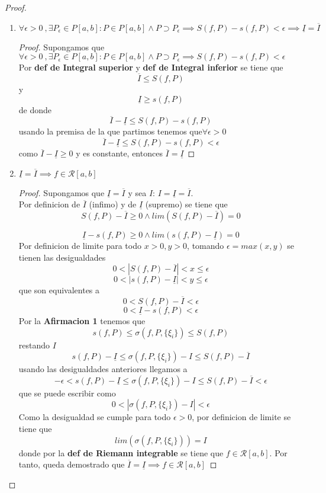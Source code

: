 \documentclass{article}
\begin{document}
\begin{proof}
\begin{enumerate}
\begin{proof}
\end{proof}
\item \(\forall \epsilon>0\ ,  \exists P_\epsilon \in P[a, b]: P \in P[a, b] \wedge P \supset P_\epsilon \implies S(f, P) - s(f, P) < \epsilon \implies \underline{I} = \overline{I}\)
\begin{proof}
Supongamos que \(\forall \epsilon>0\ ,  \exists P_\epsilon \in P[a, b]: P \in P[a, b] \wedge P \supset P_\epsilon \implies S(f, P) - s(f, P) < \epsilon\)\\

Por \textbf{def de Integral superior} y \textbf{def de Integral inferior} se tiene que
\[
 \overline{I} \leq S(f, P) 
\]
y
\[
 \underline{I} \geq s(f, P)
\]
de donde 
\[
 \overline{I}  -  \underline{I} \leq S(f,P) - s(f,P) 
\]
usando la premisa de la que partimos tenemos que\( \forall \epsilon > 0\)
\[
 \overline{I}  -  \underline{I} \leq S(f,P) - s(f,P) < \epsilon
\]
como \(\overline{I}  -  \underline{I} \geq 0\) y es constante, entonces \(\overline{I} = \underline{I}\)


\end{proof}

\item \(\underline{I} = \overline{I} \implies f \in \mathcal{R}[a, b]\)\\
\begin{proof}

Supongamos que  \(\underline{I} = \overline{I}\) y sea \(I\): \(I = \underline{I} = \overline{I}\).\\

Por definicion de \(\overline{I}\) (infimo) y de \(\underline{I}\) (supremo) se tiene que 
\[
S(f, P) - \overline{I} \geq 0 \wedge lim (S(f, P) - \overline{I}) = 0
\]

\[
\underline{I} - s(f, P) \geq 0 \wedge lim (s(f, P) - \underline{I}) = 0
\]
Por definicion de limite para todo \(x > 0, y > 0\), tomando \(\epsilon = max(x, y)\) se tienen las desigualdades 
\[
0< |S(f, P) - \overline{I} | < x \leq \epsilon
\]
\[
0< |s(f, P) - \underline{I} | < y \leq \epsilon 
\]
que son equivalentes a
\[
0< S(f, P) - \overline{I}  < \epsilon
\]
\[
0<  \underline{I} -  s(f, P)  < \epsilon
\]
Por la \textbf{Afirmacion 1} tenemos que 
\[
s(f, P) \leq \sigma(f, P,\{\xi_i\}) \leq S(f, P)
\]
restando \(I\)
\[
s(f, P) -\underline{I} \leq \sigma(f, P,\{\xi_i\}) - I \leq S(f, P) - \overline{I}
\]
usando las desigualdades anteriores llegamos a 
\[
-\epsilon < s(f, P) -\underline{I} \leq \sigma(f, P,\{\xi_i\}) - I \leq S(f, P) - \overline{I} < \epsilon
\]
que se puede escribir como
\[
0 <|\sigma(f, P,\{\xi_i\}) - I |< \epsilon
\]
Como la desigualdad se cumple para todo \(\epsilon > 0\), por definicion de limite se tiene que 
\[
lim(\sigma(f, P,\{\xi_i\})) = I
\]
donde por la \textbf{def de Riemann integrable} se tiene que \(f \in \mathcal{R}[a, b]\). Por tanto, queda demostrado que \( \overline{I} = \underline{I} \implies f \in \mathcal{R}[a, b] \)
\end{proof}


\end{enumerate}

\end{proof}
\end{document}
